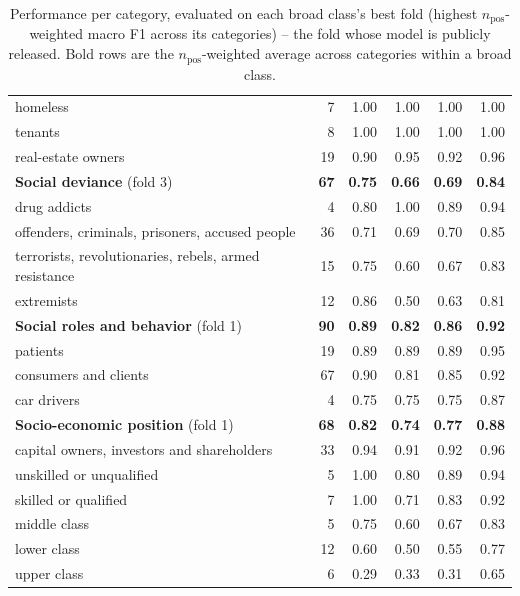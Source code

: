 \begin{table}[t]
\begin{tabular}{l r r r r r}
\quad homeless & 7 & 1.00 & 1.00 & 1.00 & 1.00 \\
\quad tenants & 8 & 1.00 & 1.00 & 1.00 & 1.00 \\
\quad real-estate owners & 19 & 0.90 & 0.95 & 0.92 & 0.96 \\
\addlinespace
\textbf{Social deviance} (fold 3) & \textbf{67} & \textbf{0.75} & \textbf{0.66} & \textbf{0.69} & \textbf{0.84} \\
\quad drug addicts & 4 & 0.80 & 1.00 & 0.89 & 0.94 \\
\quad offenders, criminals, prisoners, accused people & 36 & 0.71 & 0.69 & 0.70 & 0.85 \\
\quad terrorists, revolutionaries, rebels, armed resistance & 15 & 0.75 & 0.60 & 0.67 & 0.83 \\
\quad extremists & 12 & 0.86 & 0.50 & 0.63 & 0.81 \\
\addlinespace
\textbf{Social roles and behavior} (fold 1) & \textbf{90} & \textbf{0.89} & \textbf{0.82} & \textbf{0.86} & \textbf{0.92} \\
\quad patients & 19 & 0.89 & 0.89 & 0.89 & 0.95 \\
\quad consumers and clients & 67 & 0.90 & 0.81 & 0.85 & 0.92 \\
\quad car drivers & 4 & 0.75 & 0.75 & 0.75 & 0.87 \\
\addlinespace
\textbf{Socio-economic position} (fold 1) & \textbf{68} & \textbf{0.82} & \textbf{0.74} & \textbf{0.77} & \textbf{0.88} \\
\quad capital owners, investors and shareholders & 33 & 0.94 & 0.91 & 0.92 & 0.96 \\
\quad unskilled or unqualified & 5 & 1.00 & 0.80 & 0.89 & 0.94 \\
\quad skilled or qualified & 7 & 1.00 & 0.71 & 0.83 & 0.92 \\
\quad middle class & 5 & 0.75 & 0.60 & 0.67 & 0.83 \\
\quad lower class & 12 & 0.60 & 0.50 & 0.55 & 0.77 \\
\quad upper class & 6 & 0.29 & 0.33 & 0.31 & 0.65 \\
\bottomrule
\end{tabular}
\caption{Performance per category, evaluated on each broad class's best fold (highest $n_\text{pos}$-weighted macro F1 across its categories) -- the fold whose model is publicly released. Bold rows are the $n_\text{pos}$-weighted average across categories within a broad class.}
\label{tab:step2_best_fold_metrics}
\end{table}